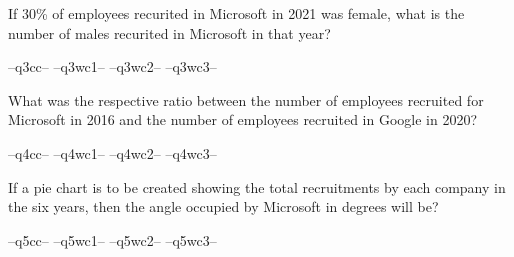 \question   If 30\% of employees recurited in Microsoft in 2021 was female, what is the number of males recurited in Microsoft in that year?

\begin{randomizechoices}
\correctchoice --q3cc-- 
\choice --q3wc1--  
\choice --q3wc2-- 
\choice --q3wc3-- 
\end{randomizechoices}

\question   What was the respective ratio between the number of employees recruited for Microsoft in 2016 and the number of employees recruited in Google in 2020?

\begin{randomizechoices}
\correctchoice --q4cc-- 
\choice --q4wc1--  
\choice --q4wc2-- 
\choice --q4wc3-- 
\end{randomizechoices}

\question   If a pie chart is to be created showing the total recruitments by each company in the six years, then the angle occupied by Microsoft in degrees will be?

\begin{randomizechoices}
\correctchoice --q5cc-- 
\choice --q5wc1--  
\choice --q5wc2-- 
\choice --q5wc3-- 
\end{randomizechoices}